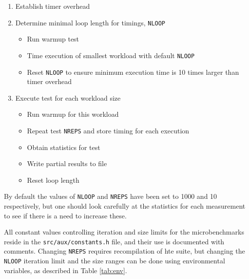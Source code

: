 \documentclass[10pt,a4paper]{report}
\begin{document}
\begin{enumerate}
\item Establish timer overhead
\item Determine minimal loop length for timings, \verb+NLOOP+
\begin{itemize}
	\item Run warmup test
	\item Time execution of smallest workload with default \verb+NLOOP+
	\item Reset \verb+NLOOP+ to ensure minimum execution time is 10 times larger than timer overhead
\end{itemize}
\item Execute test for each workload size
\begin{itemize}
	\item Run warmup for this workload
	\item Repeat test \verb+NREPS+ and store timing for each execution
	\item Obtain statistics for test
	\item Write partial results to file
	\item Reset loop length
\end{itemize}

\end{enumerate}

By default the values of \verb+NLOOP+ and \verb+NREPS+ have been set to 1000 and 10 respectively, but one should look carefully at the statistics for each measurement to see if there is a need to increase these.

All constant values controlling iteration and size limits for the microbenchmarks reside in the \texttt{src/aux/constants.h} file, and their use is documented with comments. Changing \verb+NREPS+ requires recompilation of hte suite, but changing the \verb+NLOOP+ iteration limit and the size ranges can be done using environmental variables, as described in Table \ref{tab:env}.
\end{document}
